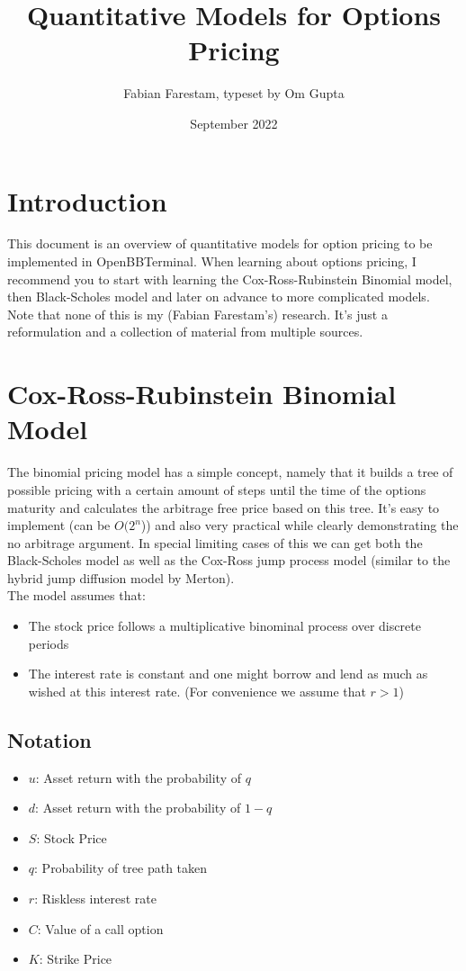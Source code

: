 \documentclass{article}
\title{Quantitative Models for Options Pricing}
\author{Fabian Farestam, typeset by Om Gupta}
\date{September 2022}
\begin{document}
\maketitle

\section{Introduction}

This document is an overview of quantitative models for option pricing to be implemented in OpenBBTerminal. When learning about options pricing, I recommend you to start with learning the Cox-Ross-Rubinstein Binomial model, then Black-Scholes model and later on advance to more complicated models. \\
Note that none of this is my (Fabian Farestam’s) research. It’s just a reformulation and a collection of material from multiple sources.

\section{Cox-Ross-Rubinstein Binomial Model}

The binomial pricing model \cite{cox} has a simple concept, namely that it builds a tree of possible pricing with a certain amount of steps until the time of the options maturity and calculates the arbitrage free price based on this tree. It’s easy to implement (can be $O(2^{n}$)) and also very practical while clearly demonstrating the no arbitrage argument. In special limiting cases of this we can get both the Black-Scholes model as well as the Cox-Ross jump process model (similar to the hybrid jump diffusion model by Merton). \\
The model assumes that:

\begin{itemize}
    \item The stock price follows a multiplicative binominal process over discrete periods
    \item The interest rate is constant and one might borrow and lend as much as wished at this interest rate. (For convenience we assume that $r > 1$)
\end{itemize}

\subsection{Notation}
\begin{itemize}
    \item $u$: Asset return with the probability of $q$ 
    \item $d$: Asset return with the probability of $1 - q$
    \item $S$: Stock Price
    \item $q$: Probability of tree path taken
    \item $r$: Riskless interest rate
    \item $C$: Value of a call option
    \item $K$: Strike Price
\end{itemize}
\end{document}
